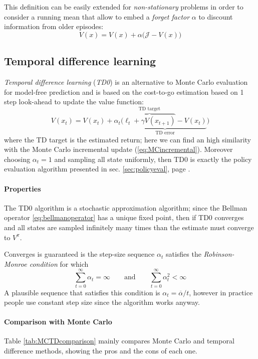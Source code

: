 	This definition can be easily extended for \textit{non-stationary} problems in order to consider a running mean that allow to embed a \textit{forget factor} $\alpha$ to discount information from older episodes:
	\begin{equation} \label{eq:MCincremental}
		V(x) = V(x) + \alpha\big(\mathcal J - V(x)\big)
	\end{equation}
	
\subsection{Temporal difference learning} \label{sec:td}
	\textit{Temporal difference learning} (\textit{TD0}) is an alternative to Monte Carlo evaluation for model-free prediction and is based on the cost-to-go estimation based on 1 step look-ahead to update the value function:
	\begin{equation}
		V(x_t) = V(x_t) + \alpha_t \big(\underbrace{ \overbrace{\ell_t + \gamma V(x_{t+1})}^\textrm{TD target} - V(x_t) }_\textrm{TD error}\big)
	\end{equation}
	where the TD target is the estimated return; here we can find an high similarity with the Monte Carlo incremental update (\ref{eq:MCincremental}). Moreover choosing $\alpha_t = 1$ and sampling all state uniformly, then TD0 is exactly the policy evaluation algorithm presented in sec. \ref{sec:policyeval}, page \pageref{sec:policyeval}.
	
	\paragraph{Properties} The TD0 algorithm is a stochastic approximation algorithm; since the Bellman operator \ref{eq:bellmanoperator} has a unique fixed point, then if TD0 converges and all states are sampled infinitely many times than the estimate must converge to $V^\pi$.
	
	Converges is guaranteed is the step-size sequence $\alpha_t$ satisfies the \textit{Robinson-Monroe condition} for which
	\[ \sum_{t=0}^\infty \alpha_t = \infty \qquad \textrm{and} \qquad \sum_{t=0}^{\infty} \alpha_t^2 < \infty \]
	A plausible sequence that satisfies this condition is $\alpha_t = \overline \alpha / t$, however in practice people use constant step size since the algorithm works anyway.
	
	\paragraph{Comparison with Monte Carlo} 
	Table \ref{tab:MCTDcomparison} mainly compares Monte Carlo and temporal difference methods, showing the pros and the cons of each one.
	
